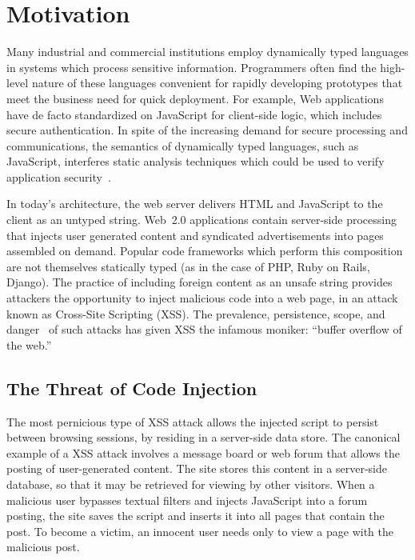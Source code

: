 
\chapter{Motivation}
\label{ch:motivation}

Many industrial and commercial institutions employ dynamically typed languages in systems which process sensitive information.
Programmers often find the high-level nature of these languages convenient for rapidly developing prototypes that meet the business need for quick deployment.
For example, Web applications have de facto standardized on JavaScript for client-side logic, which includes secure authentication.
In spite of the increasing demand for secure processing and communications, the semantics of dynamically typed languages, such as JavaScript, interferes static analysis techniques which could be used to verify application security~\cite{robertson.vigna+09}.

In today's architecture, the web server delivers HTML and JavaScript to the client as an untyped string.
Web~2.0 applications contain server-side processing that injects user generated content and syndicated advertisements into pages assembled on demand.
Popular code frameworks which perform this composition are not themselves statically typed (as in the case of PHP, Ruby on Rails, Django).
The practice of including foreign content as an unsafe string provides attackers the opportunity to inject malicious code into a web page, in an attack known as Cross-Site Scripting (XSS).
The prevalence, persistence, scope, and danger~\cite{whitehat, cwe} of such attacks has given XSS the infamous moniker: ``buffer overflow of the web.''

\section{The Threat of Code Injection}

The most pernicious type of XSS attack allows the injected script to persist between browsing sessions, by residing in a server-side data store.
The canonical example of a  XSS attack involves a message board or web forum that allows the posting of user-generated content.
The site stores this content in a server-side database, so that it may be retrieved for viewing by other visitors.
When a malicious user bypasses textual filters and injects JavaScript into a forum posting, the site saves the script and inserts it into all pages that contain the post.
To become a victim, an innocent user needs only to view a page with the malicious post.

